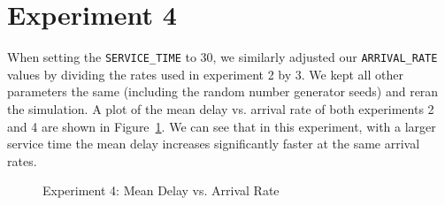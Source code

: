 \section*{Experiment 4}
When setting the \texttt{SERVICE\_TIME} to 30, we similarly adjusted our \texttt{ARRIVAL\_RATE} values by dividing the rates used in experiment 2 by 3. We kept all other parameters the same (including the random number generator seeds) and reran the simulation. A plot of the mean delay vs. arrival rate of both experiments 2 and 4 are shown in Figure~\ref{fig:exp4}. We can see that in this experiment, with a larger service time the mean delay increases significantly faster at the same arrival rates.

\begin{figure}[h]
\centering
{}
\caption{Experiment 4: Mean Delay vs. Arrival Rate}
\label{fig:exp4}
\end{figure}